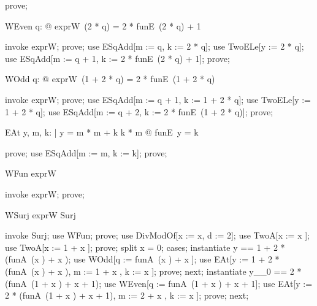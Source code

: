 \documentclass{article}
\begin{document}
\begin{zproof}
prove;
\end{zproof}

\begin{theorem}{WEven}
  \forall q: \nat @ exprW~(2 * q) = 2 * funE~(2 * q) + 1
\end{theorem}

\begin{zproof}
invoke exprW;
prove;
use ESqAdd[m := q, k := 2 * q];
use TwoELe[y := 2 * q];
use ESqAdd[m := q + 1, k := 2 * funE~(2 * q) + 1];
prove;
\end{zproof}

\begin{theorem}{WOdd}
  \forall q: \nat @ exprW~(1 + 2 * q) = 2 * funE~(1 + 2 * q)
\end{theorem}

\begin{zproof}
invoke exprW;
prove;
use ESqAdd[m := q + 1, k := 1 + 2 * q];
use TwoELe[y := 1 + 2 * q];
use ESqAdd[m := q + 2, k := 2 * funE~(1 + 2 * q)];
prove;
\end{zproof}

\begin{theorem}{EAt}
  \forall y, m, k: \nat | y = m * m + k \land k  * m @ funE~y = k
\end{theorem}

\begin{zproof}
prove;
use ESqAdd[m := m, k := k];
prove;
\end{zproof}

\begin{theorem}{WFun}
  exprW \in \nat \fun \nat
\end{theorem}

\begin{zproof}
invoke exprW;
prove;
\end{zproof}

\begin{theorem}{WSurj}
  exprW \in Surj
\end{theorem}

\begin{zproof}
invoke Surj;
use WFun;
prove;
use DivModOf[x := x, d := 2];
use TwoA[x := x ];
use TwoA[x := 1 + x ];
prove;
split x  = 0;
cases;
instantiate y == 1 + 2 * (funA~(x ) + x );
use WOdd[q := funA~(x ) + x ];
use EAt[y := 1 + 2 * (funA~(x ) + x ), m := 1 + x , k := x ];
prove;
next;
instantiate y\_\_0 == 2 * (funA~(1 + x ) + x  + 1);
use WEven[q := funA~(1 + x ) + x  + 1];
use EAt[y := 2 * (funA~(1 + x ) + x  + 1), m := 2 + x , k := x ];
prove;
next;
\end{zproof}
\end{document}

